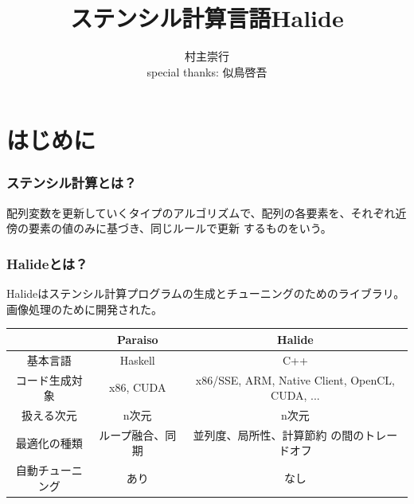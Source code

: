 \documentclass[dvipdfmx,cjk]{beamer}
\begin{document}
\title[Halide]{ステンシル計算言語Halide}
\author[T. Muranushi]{村主崇行\\special thanks: 似鳥啓吾}            %

\begin{frame}                  %
\titlepage                     %
\end{frame}

\begin{frame}                  %
\tableofcontents
\end{frame}

\section{はじめに} 

\begin{frame}\frametitle{ステンシル計算とは？}
配列変数を更新していくタイプのアルゴリズムで、配列の各要素を、それぞれ近傍の要素の値のみに基づき、同じルールで更新
するものをいう。
\end{frame}

\begin{frame}\frametitle{Halideとは？}
Halideはステンシル計算プログラムの生成とチューニングのためのライブラリ。
画像処理のために開発された。\cite{ragan2012decoupling,ragan2013halide}


\begin{center}
  \begin{tabular}{|c|c|c|}
    \hline
    &Paraiso & Halide\\
    \hline
    基本言語 & Haskell & C++ \\
    コード生成対象 & x86, CUDA &
    \multicolumn{1}{p{5cm}|}{x86/SSE, ARM, Native Client, OpenCL, CUDA,  ... }\\
    扱える次元 & n次元 & n次元 \\ 
    最適化の種類 & ループ融合、同期 & \multicolumn{1}{p{5cm}|}{並列度、局所性、計算節約 の間のトレードオフ} \\ 
    自動チューニング & あり & なし \\ 
    \hline
  \end{tabular}
\end{center}
\end{frame}
\end{document}
